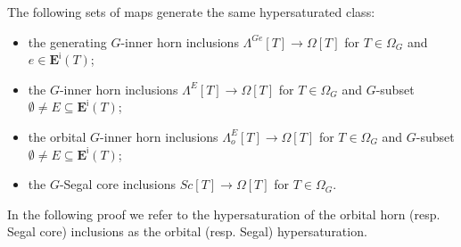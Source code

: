 \documentclass[a4paper,10pt
 ,draft
]{article}%
\begin{document}
\begin{proposition}\label{HYPER PROP}
The following sets of maps generate the same hypersaturated class:
\begin{itemize}
\item the generating $G$-inner horn inclusions
$\Lambda^{Ge} [T] \to \Omega[T]$ for $T \in \Omega_G$ and 
$e \in \boldsymbol{E}^{\mathsf{i}}(T)$; 
\item the $G$-inner horn inclusions
$\Lambda^{E} [T] \to \Omega[T]$ for $T \in \Omega_G$ and 
$G$-subset $\emptyset \neq E \subseteq \boldsymbol{E}^{\mathsf{i}}(T)$; 
\item the orbital $G$-inner horn inclusions
$\Lambda^{E}_o [T] \to \Omega[T]$ for $T \in \Omega_G$ and 
$G$-subset $\emptyset \neq E \subseteq \boldsymbol{E}^{\mathsf{i}}(T)$; 
\item the $G$-Segal core inclusions
$Sc[T] \to \Omega[T]$ for $T \in \Omega_G$.
\end{itemize}
\end{proposition}

In the following proof we refer to the hypersaturation
of the orbital horn (resp. Segal core) inclusions as the orbital (resp. Segal) hypersaturation.
\end{document}
